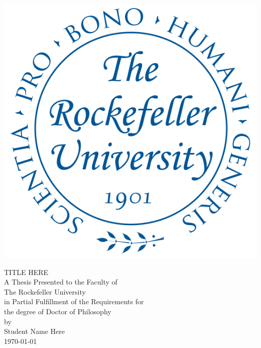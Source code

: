   
\begin{titlepage}
\begin{center}

\begin{singlespacing}
\vspace*{2\baselineskip}
\includegraphics[width = 1.75 in]{figures/Seal-blue.png}\\
\vspace*{5\baselineskip}

TITLE HERE\\ %

\vspace{8\baselineskip}
A Thesis Presented to the Faculty of\\
The Rockefeller University\\
in Partial Fulfillment of the Requirements for\\
the degree of Doctor of Philosophy\\
\vspace{8\baselineskip}
by\\
Student Name Here\\ %
\monthyeardate\today
\vspace{3\baselineskip}
\vfill


\end{singlespacing}

\end{center}
\end{titlepage}


